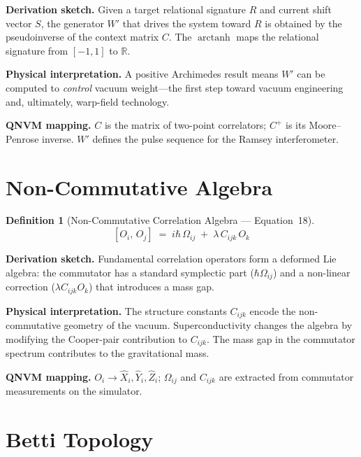 \documentclass[11pt,a4paper]{article}
\newtheorem{definition}{Definition}[section]
\theoremstyle{remark}
\DeclareMathOperator{\arctanh}{arctanh}
\begin{document}
\textbf{Derivation sketch.}\quad
Given a target relational signature $R$ and current shift vector $S$, the generator $W'$ that drives the system toward $R$ is obtained by the pseudoinverse of the context matrix $C$.  The $\arctanh$ maps the relational signature from $[-1,1]$ to $\mathbb{R}$.

\textbf{Physical interpretation.}\quad
A positive Archimedes result means $W'$ can be computed to \emph{control} vacuum weight---the first step toward vacuum engineering and, ultimately, warp-field technology.

\textbf{QNVM mapping.}\quad
$C$ is the matrix of two-point correlators; $C^{+}$ is its Moore--Penrose inverse.  $W'$ defines the pulse sequence for the Ramsey interferometer.

\section{Non-Commutative Algebra}
\label{sec:eq18}

\begin{definition}[Non-Commutative Correlation Algebra --- Equation~18]
\begin{equation}\label{eq:noncomm}
    [O_i,\, O_j] \;=\; i\hbar\,\Omega_{ij} \;+\; \lambda\, C_{ijk}\, O_k
\end{equation}
\end{definition}

\textbf{Derivation sketch.}\quad
Fundamental correlation operators form a deformed Lie algebra: the commutator has a standard symplectic part ($\hbar\Omega_{ij}$) and a non-linear correction ($\lambda C_{ijk} O_k$) that introduces a mass gap.

\textbf{Physical interpretation.}\quad
The structure constants $C_{ijk}$ encode the non-commutative geometry of the vacuum.  Superconductivity changes the algebra by modifying the Cooper-pair contribution to $C_{ijk}$.  The mass gap in the commutator spectrum contributes to the gravitational mass.

\textbf{QNVM mapping.}\quad
$O_i \to \hat{X}_i, \hat{Y}_i, \hat{Z}_i$; $\Omega_{ij}$ and $C_{ijk}$ are extracted from commutator measurements on the simulator.

\section{Betti Topology}
\label{sec:eq19}
\end{document}
